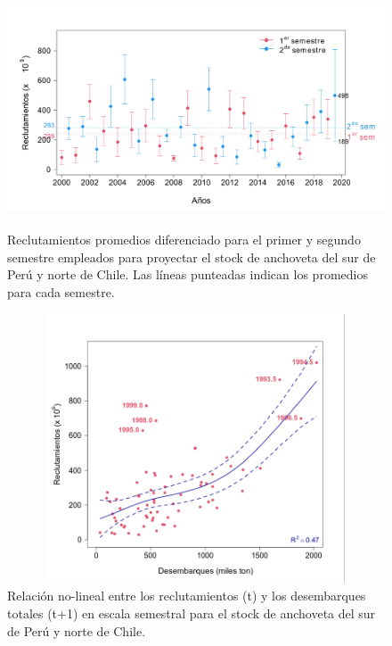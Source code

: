 \documentclass[letter,11pt]{article}
\begin{document}
\vspace{0.5cm}
\begin{figure}[htb!]
 \centering
 \includegraphics[width=14cm,height=7cm]{fig/figura11.pdf}
 \caption{Reclutamientos promedios diferenciado para el primer y segundo semestre empleados para proyectar el stock de anchoveta del sur de Per\'u y norte de Chile. Las l\'ineas punteadas indican los promedios para cada semestre.}
 \label{Fig11}
\end{figure}
\vspace{0.5cm}



\vspace{0.5cm}
\begin{figure}[htb!]
 \centering
 \includegraphics[width=12cm,height=8cm]{fig/figura12.pdf}
 \caption{Relaci\'on no-lineal entre los reclutamientos (t) y los desembarques totales (t+1) en escala semestral para el stock de anchoveta del sur de Per\'u y norte de Chile.}
 \label{Fig12}
\end{figure}
\vspace{0.5cm}
\end{document}
